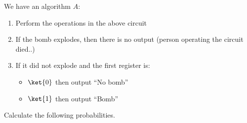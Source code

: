 \documentclass[12pt]{exam}
\begin{document}
\begin{questions}
\begin{solution}
\begin{itemize}
\end{itemize}
  \end{solution}
  
\question
We have an algorithm $A$:

\begin{enumerate}
\item Perform the operations in the above circuit
\item If the bomb explodes, then there is no output (person operating
  the circuit died..)
\item If it did not explode and the first register is:
  \begin{itemize}
  \item $\ket{0}$ then output ``No bomb''
  \item $\ket{1}$ then output ``Bomb''
  \end{itemize}
\end{enumerate}

Calculate the following probabilities.

\end{questions}
\end{document}
